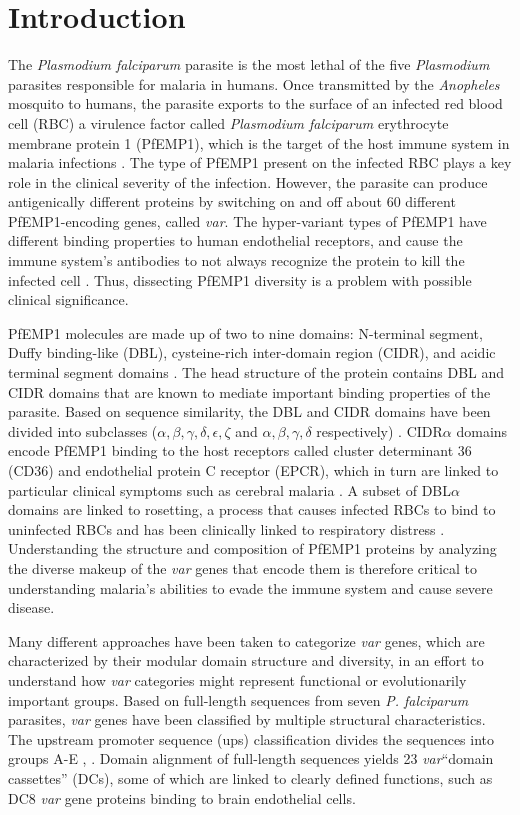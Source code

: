 \documentclass[10pt,twocolumn,superscriptaddress]{revtex4-1}
\newcommand{\var}{{\it var}\xspace}
\newcommand{\pf}{{\it P. falciparum}\xspace}
\newcommand{\dbla}{{DBL$\alpha$}\xspace}
\newcommand{\cidra}{{CIDR$\alpha$}\xspace}
\begin{document}
\section{Introduction} 
The \textit{Plasmodium falciparum} parasite is the most lethal of the five \textit{Plasmodium} parasites responsible for malaria in humans. Once transmitted by the \textit{Anopheles} mosquito to humans, the parasite exports to the surface of an infected red blood cell (RBC) a virulence factor called \textit{Plasmodium falciparum} erythrocyte membrane protein 1 (PfEMP1), which is the target of the host immune system in malaria infections \cite{chan2012}. The type of PfEMP1 present on the infected RBC plays a key role in the clinical severity of the infection. However, the parasite can produce antigenically different proteins by switching on and off about 60 different PfEMP1-encoding genes, called \var \cite{gardner2002}. The hyper-variant types of PfEMP1 have different binding properties to human endothelial receptors, and cause the immune system's antibodies to not always recognize the protein to kill the infected cell \cite{gardner2002}. Thus, dissecting PfEMP1 diversity is a problem with possible clinical significance. 

PfEMP1 molecules are made up of two to nine domains: N-terminal segment, Duffy binding-like (DBL), cysteine-rich inter-domain region (CIDR), and acidic terminal segment domains \cite{rask2010}. The head structure of the protein contains DBL and CIDR domains that are known to mediate important binding properties of the parasite. Based on sequence similarity, the DBL and CIDR domains have been divided into subclasses ($\alpha, \beta, \gamma, \delta, \epsilon , \zeta$ and $\alpha, \beta, \gamma, \delta$ respectively) \cite{rask2010} . \cidra domains encode PfEMP1 binding to the host receptors called cluster determinant 36 (CD36) and endothelial protein C receptor (EPCR), which in turn are linked to particular clinical symptoms such as cerebral malaria \cite{hsieh2016}. A subset of \dbla domains are linked to rosetting, a process that causes infected RBCs to bind to uninfected RBCs and has been clinically linked to respiratory distress \cite{lau2015}. Understanding the structure and composition of PfEMP1 proteins by analyzing the diverse makeup of the \var genes that encode them is therefore critical to understanding malaria's abilities to evade the immune system and cause severe disease. 

Many different approaches have been taken to categorize \var genes, which are characterized by their modular domain structure and diversity, in an effort to understand how \var categories might represent functional or evolutionarily important groups. Based on full-length sequences from seven \pf parasites, \var genes have been classified by multiple structural characteristics. The upstream promoter sequence (ups) classification divides the sequences into groups A-E \cite{rask2010}, \cite{vazquez2002}. Domain alignment of full-length sequences yields 23 \var ``domain cassettes'' (DCs), some of which are linked to clearly defined functions, such as DC8 \var gene proteins binding to brain endothelial cells. 
\end{document}
